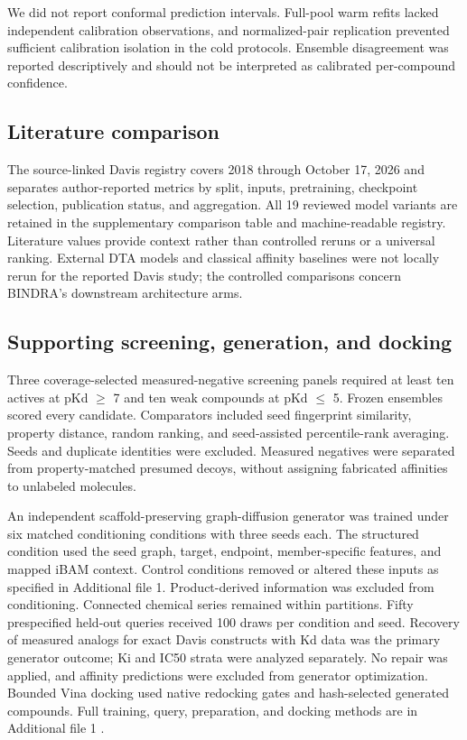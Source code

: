 \documentclass[12pt,a4paper]{article}
\begin{document}
We did not report conformal prediction intervals. Full-pool warm refits lacked independent calibration observations, and normalized-pair replication prevented sufficient calibration isolation in the cold protocols. Ensemble disagreement was reported descriptively and should not be interpreted as calibrated per-compound confidence.

\subsection*{Literature comparison}
The source-linked Davis registry covers 2018 through October 17, 2026 and separates author-reported metrics by split, inputs, pretraining, checkpoint selection, publication status, and aggregation. All 19 reviewed model variants are retained in the supplementary comparison table and machine-readable registry. Literature values provide context rather than controlled reruns or a universal ranking. External DTA models and classical affinity baselines were not locally rerun for the reported Davis study; the controlled comparisons concern BINDRA's downstream architecture arms.

\subsection*{Supporting screening, generation, and docking}
Three coverage-selected measured-negative screening panels required at least ten actives at pKd \(\geq\) 7 and ten weak compounds at pKd \(\leq\) 5. Frozen ensembles scored every candidate. Comparators included seed fingerprint similarity, property distance, random ranking, and seed-assisted percentile-rank averaging. Seeds and duplicate identities were excluded. Measured negatives were separated from property-matched presumed decoys, without assigning fabricated affinities to unlabeled molecules.

An independent scaffold-preserving graph-diffusion generator was trained under six matched conditioning conditions with three seeds each. The structured condition used the seed graph, target, endpoint, member-specific features, and mapped iBAM context. Control conditions removed or altered these inputs as specified in Additional file 1. Product-derived information was excluded from conditioning. Connected chemical series remained within partitions. Fifty prespecified held-out queries received 100 draws per condition and seed. Recovery of measured analogs for exact Davis constructs with Kd data was the primary generator outcome; Ki and IC50 strata were analyzed separately. No repair was applied, and affinity predictions were excluded from generator optimization. Bounded Vina docking used native redocking gates and hash-selected generated compounds. Full training, query, preparation, and docking methods are in Additional file 1 \citep{ho2020,discrete2021,vina2021,meeko,posebusters2024}.
\end{document}
